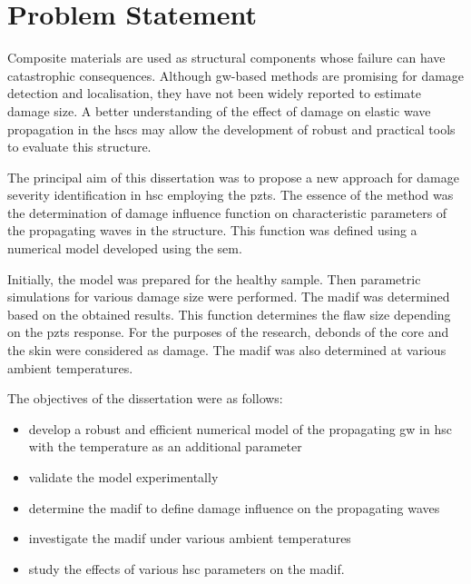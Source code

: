 

\chapter[Problem Statement]{Problem Statement}
\label{ch:problem}



Composite materials are used as structural components whose failure can have catastrophic consequences.
Although \ac{gw}-based methods are promising for damage detection and localisation, they have not been widely reported to estimate damage size.
A better understanding of the effect of damage on elastic wave propagation in the \acp{hsc} may allow the development of robust and practical tools to evaluate this structure.

The principal aim of this dissertation was to propose a new approach for damage severity identification in \ac{hsc} employing the \acp{pzt}.
The essence of the method was the determination of damage influence function on characteristic parameters of the propagating waves in the structure.
This function was defined using a numerical model developed using the \ac{sem}.

Initially, the model was prepared for the healthy sample.
Then parametric simulations for various damage size were performed.
The \ac{madif} was determined based on the obtained results. 
This function determines the flaw size depending on the \acp{pzt} response.
For the purposes of the research, debonds of the core and the skin were considered as damage.
The \ac{madif} was also determined at various ambient temperatures.

The objectives of the dissertation were as follows:
\begin{itemize}
	\item develop a robust and efficient numerical model of the propagating \ac{gw} in \ac{hsc} with the temperature as an additional parameter
	\item validate the model experimentally
	\item determine the \ac{madif} to define damage influence on the propagating waves
	\item investigate the \ac{madif} under various ambient temperatures
	\item study the effects of various \ac{hsc} parameters on the \ac{madif}.
\end{itemize}


